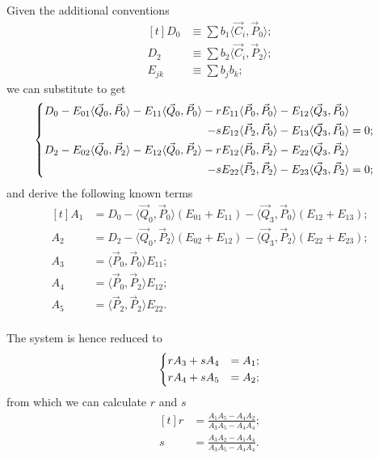 \documentclass{scrartcl}
\newcommand\V[1]{\vec{#1}}
\newcommand\SP[2]{\langle #1, #2 \rangle}
\begin{document}
Given the additional conventions
\begin{equation}\label{eq:DE}
\begin{aligned}[t]
    D_0 &\equiv \sum b_1 \SP{\V{C}_i}{\V{P}_0}; \\
    D_2 &\equiv \sum b_2 \SP{\V{C}_i}{\V{P}_2}; \\
    E_{jk} &\equiv \sum b_j b_k;
\end{aligned}
\end{equation}
we can substitute to get
\begin{equation*}
\begin{dcases}
\begin{split}
    D_0 - E_{01}   \SP{\V{Q}_0}{\V{P}_0} -
	  E_{11}   \SP{\V{Q}_0}{\V{P}_0} -
	  r E_{11} \SP{\V{P}_0}{\V{P}_0} -
	  E_{12}   \SP{\V{Q}_3}{\V{P}_0} \\ -
	  s E_{12} \SP{\V{P}_2}{\V{P}_0} -
	  E_{13}   \SP{\V{Q}_3}{\V{P}_0} &= 0;
\end{split} \\
\begin{split}
    D_2 - E_{02}   \SP{\V{Q}_0}{\V{P}_2} -
	  E_{12}   \SP{\V{Q}_0}{\V{P}_2} -
	  r E_{12} \SP{\V{P}_0}{\V{P}_2} -
	  E_{22}   \SP{\V{Q}_3}{\V{P}_2} \\ -
	  s E_{22} \SP{\V{P}_2}{\V{P}_2} -
	  E_{23}   \SP{\V{Q}_3}{\V{P}_2} &= 0;
\end{split} \\
\end{dcases}
\end{equation*}
and derive the following known terms
\begin{equation}\label{eq:ACD}
\begin{aligned}[t]
A_1 &= D_0 - \SP{\V{Q}_0}{\V{P}_0} (E_{01} + E_{11}) -
    \SP{\V{Q}_3}{\V{P}_0} (E_{12} + E_{13}); \\
A_2 &= D_2 - \SP{\V{Q}_0}{\V{P}_2} (E_{02} + E_{12}) -
    \SP{\V{Q}_3}{\V{P}_2} (E_{22} + E_{23}); \\
A_3 &= \SP{\V{P}_0}{\V{P}_0} E_{11}; \\
A_4 &= \SP{\V{P}_0}{\V{P}_2} E_{12}; \\
A_5 &= \SP{\V{P}_2}{\V{P}_2} E_{22}. \\
\end{aligned}
\end{equation}

The system is hence reduced to
\begin{equation*}
\begin{dcases}
    r A_3 + s A_4 &= A_1; \\
    r A_4 + s A_5 &= A_2; \\
\end{dcases}
\end{equation*}
from which we can calculate $r$ and $s$
\begin{equation}\label{eq:rs}
\begin{aligned}[t]
    r &= \frac{A_1 A_5 - A_4 A_2}{A_3 A_5 - A_4 A_4}; \\
    s &= \frac{A_3 A_2 - A_1 A_4}{A_3 A_5 - A_4 A_4}. \\
\end{aligned}
\end{equation}
\end{document}

